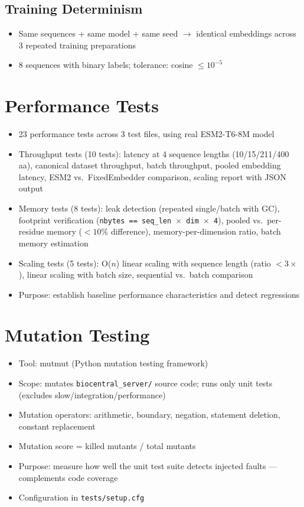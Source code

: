 \subsection{Training Determinism}\label{sec:exp-training}
\begin{itemize}
  \item Same sequences + same model + same seed $\to$ identical embeddings across 3 repeated training preparations
  \item 8 sequences with binary labels; tolerance: cosine $\leq 10^{-5}$
\end{itemize}

\section{Performance Tests}\label{sec:performance-tests}
\begin{itemize}
  \item 23 performance tests across 3 test files, using real ESM2-T6-8M model
  \item Throughput tests (10 tests): latency at 4 sequence lengths (10/15/211/400\,aa), canonical dataset throughput, batch throughput, pooled embedding latency, ESM2 vs.\ FixedEmbedder comparison, scaling report with JSON output
  \item Memory tests (8 tests): leak detection (repeated single/batch with GC), footprint verification (\texttt{nbytes == seq\_len $\times$ dim $\times$ 4}), pooled vs.\ per-residue memory ($<10\%$ difference), memory-per-dimension ratio, batch memory estimation
  \item Scaling tests (5 tests): O($n$) linear scaling with sequence length (ratio $< 3\times$), linear scaling with batch size, sequential vs.\ batch comparison
  \item Purpose: establish baseline performance characteristics and detect regressions
\end{itemize}

\section{Mutation Testing}\label{sec:mutation-testing}
\begin{itemize}
  \item Tool: mutmut (Python mutation testing framework)
  \item Scope: mutates \texttt{biocentral\_server/} source code; runs only unit tests (excludes slow/integration/performance)
  \item Mutation operators: arithmetic, boundary, negation, statement deletion, constant replacement
  \item Mutation score = killed mutants / total mutants
  \item Purpose: measure how well the unit test suite detects injected faults --- complements code coverage
  \item Configuration in \texttt{tests/setup.cfg}
\end{itemize}
